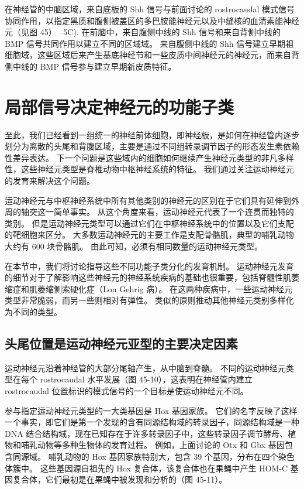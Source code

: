 在神经管的中脑区域，来自底板的 Shh 信号与前面讨论的 rostrocaudal 模式信号协同作用，以指定黑质和腹侧被盖区的多巴胺能神经元以及中缝核的血清素能神经元（见图 45） –5C). 在前脑中，来自腹侧中线的 Shh 信号和来自背侧中线的 BMP 信号共同作用以建立不同的区域域。 来自腹侧中线的 Shh 信号建立早期祖细胞域，这些区域后来产生基底神经节和一些皮质中间神经元的神经元，而来自背侧中线的 BMP 信号参与建立早期新皮质特征。


\section{局部信号决定神经元的功能子类}
至此，我们已经看到一组统一的神经前体细胞，即神经板，是如何在神经管内逐步划分为离散的头尾和背腹区域，主要是通过不同组转录调节因子的形态发生素依赖性差异表达。 下一个问题是这些域内的细胞如何继续产生神经元类型的非凡多样性，这些神经元类型是脊椎动物中枢神经系统的特征。 我们通过关注运动神经元的发育来解决这个问题。

运动神经元与中枢神经系统中所有其他类别的神经元的区别在于它们具有延伸到外周的轴突这一简单事实。 从这个角度来看，运动神经元代表了一个连贯而独特的类别。 但是运动神经元类型可以通过它们在中枢神经系统中的位置以及它们支配的靶细胞来区分。 大多数运动神经元的主要工作是支配骨骼肌，典型的哺乳动物大约有 600 块骨骼肌。 由此可知，必须有相同数量的运动神经元类型。

在本节中，我们将讨论指导这些不同功能子类分化的发育机制。 运动神经元发育的细节对于了解影响这些神经元的神经系统疾病的基础也很重要，包括脊髓性肌萎缩症和肌萎缩侧索硬化症（Lou Gehrig 病）。 在这两种疾病中，一些运动神经元类型非常脆弱，而另一些则相对有弹性。 类似的原则推动其他神经元类别多样化为不同的类型。

\subsection{头尾位置是运动神经元亚型的主要决定因素}
运动神经元沿着神经管的大部分尾轴产生，从中脑到脊髓。 不同的运动神经元类型在每个 rostrocaudal 水平发展（图 45-10），这表明在神经管内建立 rostrocaudal 位置标识的模式信号的一个目标是使运动神经元不同。

参与指定运动神经元类型的一大类基因是 Hox 基因家族。 它们的名字反映了这样一个事实，即它们是第一个发现的含有同源结构域的转录因子，同源结构域是一种 DNA 结合结构域，现在已知存在于许多转录因子中，这些转录因子调节酵母、植物和哺乳动物等多种生物体的发育过程。 例如，上面讨论的 Otx 和 Gbx 基因包含同源域。 哺乳动物的 Hox 基因家族特别大，包含 39 个基因，分布在四个染色体簇中。 这些基因源自祖先的 Hox 复合体，该复合体也在果蝇中产生 HOM-C 基因复合体，它们最初是在果蝇中被发现和分析的（图 45-11）。

